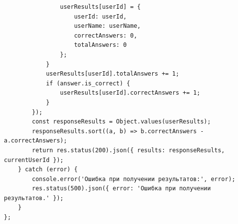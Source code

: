 \documentclass[14pt]{extarticle} %
\begin{document}
\begin{lstlisting}
                userResults[userId] = {
                    userId: userId,
                    userName: userName,
                    correctAnswers: 0,
                    totalAnswers: 0
                };
            }   
            userResults[userId].totalAnswers += 1;
            if (answer.is_correct) {
                userResults[userId].correctAnswers += 1;
            }
        }); 
        const responseResults = Object.values(userResults);
        responseResults.sort((a, b) => b.correctAnswers - a.correctAnswers);
        return res.status(200).json({ results: responseResults, currentUserId });
    } catch (error) {
        console.error('Ошибка при получении результатов:', error);
        res.status(500).json({ error: 'Ошибка при получении результатов.' });
    }
};
\end{lstlisting}
\end{document}
